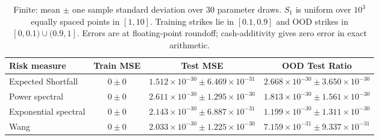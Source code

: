 \begin{table}[ht]
    \centering
    \begin{tabular}{lccc}
        \toprule
        Risk measure & Train MSE & Test MSE & OOD Test Ratio \\
        \midrule
        Expected Shortfall & $0\pm 0$ & $1.512\times 10^{-30}\pm 6.469\times 10^{-31}$ & $2.668\times 10^{-30}\pm 3.650\times 10^{-30}$ \\
        Power spectral & $0\pm 0$ & $2.611\times 10^{-30}\pm 1.295\times 10^{-30}$ & $1.813\times 10^{-30}\pm 1.561\times 10^{-30}$ \\
        Exponential spectral & $0\pm 0$ & $2.143\times 10^{-30}\pm 6.887\times 10^{-31}$ & $1.199\times 10^{-30}\pm 1.311\times 10^{-30}$ \\
        Wang & $0\pm 0$ & $2.033\times 10^{-30}\pm 1.225\times 10^{-30}$ & $7.159\times 10^{-31}\pm 9.337\times 10^{-31}$ \\
        \bottomrule
    \end{tabular}
    \caption{Finite: mean $\pm$ one sample standard deviation over 30 parameter draws. $S_1$ is uniform over $10^3$ equally spaced points in $[1,10]$. Training strikes lie in $[0.1,0.9]$ and OOD strikes in $[0,0.1)\cup(0.9,1]$. Errors are at floating-point roundoff; cash-additivity gives zero error in exact arithmetic.}
    \label{tab:risk-finite}
\end{table}
